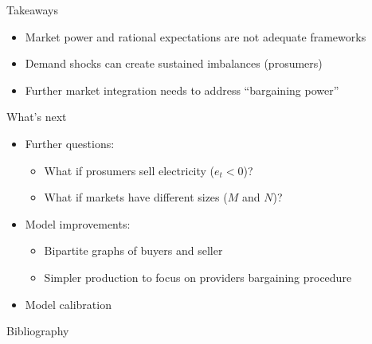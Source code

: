 \documentclass{beamer}
\begin{document}
\begin{frame}{Takeaways}
    \begin{itemize} \setlength\itemsep{1.5em}
        \item Market power and rational expectations are not adequate frameworks \pause
        \item Demand shocks can create sustained imbalances (prosumers) \pause
        \item Further market integration needs to address ``bargaining power''
    \end{itemize}
\end{frame}

\begin{frame}{What's next}
    \begin{itemize} \setlength\itemsep{1.5em}
        \item Further questions: \pause
              \begin{itemize} \setlength\itemsep{1em}
                  \item What if prosumers sell electricity ($e_t < 0$)? \pause
                  \item What if markets have different sizes ($M$ and $N$)? \pause
              \end{itemize}
        \item Model improvements: \pause
              \begin{itemize} \setlength\itemsep{1em}
                  \item Bipartite graphs of buyers and seller \pause
                  \item Simpler production to focus on providers bargaining procedure \pause
              \end{itemize}
        \item Model calibration
    \end{itemize}
\end{frame}


\begin{frame}[allowframebreaks]{Bibliography}
    \printbibliography
\end{frame}
\end{document}
